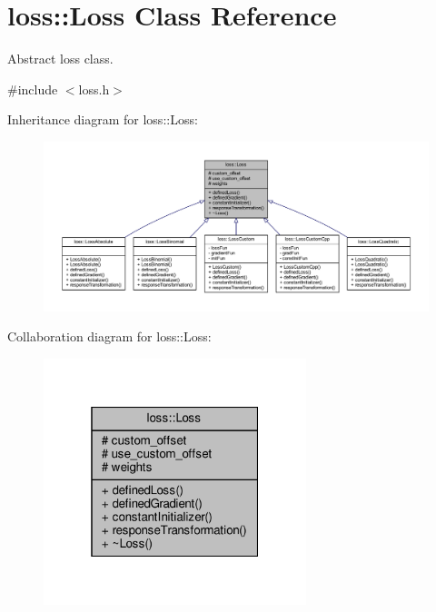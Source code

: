 \hypertarget{classloss_1_1_loss}{}\section{loss\+:\+:Loss Class Reference}
\label{classloss_1_1_loss}


Abstract loss class.  




{\ttfamily \#include $<$loss.\+h$>$}



Inheritance diagram for loss\+:\+:Loss\+:\nopagebreak
\begin{figure}[H]
\begin{center}
\leavevmode
\includegraphics[width=350pt]{classloss_1_1_loss__inherit__graph}
\end{center}
\end{figure}


Collaboration diagram for loss\+:\+:Loss\+:\nopagebreak
\begin{figure}[H]
\begin{center}
\leavevmode
\includegraphics[width=217pt]{classloss_1_1_loss__coll__graph}
\end{center}
\end{figure}
